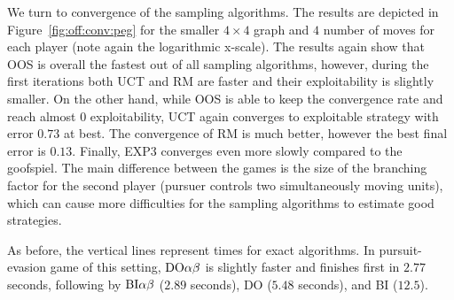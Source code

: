 We turn to convergence of the sampling algorithms.
The results are depicted in Figure~\ref{fig:off:conv:peg} for the smaller $4\times4$ graph and $4$ number of moves for each player (note again the logarithmic x-scale).
The results again show that OOS is overall the fastest out of all sampling algorithms, however, during the first iterations both UCT and RM are faster and their exploitability is slightly smaller. 
On the other hand, while OOS is able to keep the convergence rate and reach almost $0$ exploitability, UCT again converges to exploitable strategy with error $0.73$ at best. 
The convergence of RM is much better, however the best final error is $0.13$.
Finally, EXP3 converges even more slowly compared to the goofspiel.
The main difference between the games is the size of the branching factor for the second player (pursuer controls two simultaneously moving units), which can cause more difficulties for the sampling algorithms to estimate good strategies.

As before, the vertical lines represent times for exact algorithms.
In pursuit-evasion game of this setting, $\textrm{DO}\alpha\beta$ is slightly faster and finishes first in $2.77$ seconds, following by $\textrm{BI}\alpha\beta$ ($2.89$ seconds), \textsc{DO} ($5.48$ seconds), and \textsc{BI} ($12.5$).


